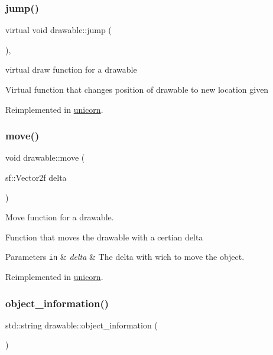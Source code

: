\subsubsection{\texorpdfstring{jump()}{jump()}}
{\footnotesize\ttfamily virtual void drawable\+::jump (\begin{DoxyParamCaption}{ }\end{DoxyParamCaption})\hspace{0.3cm}{\ttfamily [inline]}, {\ttfamily [virtual]}}



virtual draw function for a drawable 

Virtual function that changes position of drawable to new location given 

Reimplemented in \hyperlink{classunicorn_a07d5ca4e66632c0e871221a27146805a}{unicorn}.

\mbox{\label{classdrawable_ad0d3930c045cc6776aa2c3965be32491}} 
\subsubsection{\texorpdfstring{move()}{move()}}
{\footnotesize\ttfamily void drawable\+::move (\begin{DoxyParamCaption}\item[{sf\+::\+Vector2f}]{delta }\end{DoxyParamCaption})\hspace{0.3cm}{\ttfamily [virtual]}}



Move function for a drawable. 

Function that moves the drawable with a certian delta


\begin{DoxyParams}[1]{Parameters}
\mbox{\tt in}  & {\em delta} & The delta with wich to move the object. \\
\hline
\end{DoxyParams}


Reimplemented in \hyperlink{classunicorn_a162f200a68342f7bc0baaf17c8cf3f9f}{unicorn}.

\mbox{\label{classdrawable_a2ed0f8bb53f33477f7722efa7bb24583}} 
\subsubsection{\texorpdfstring{object\+\_\+information()}{object\_information()}}
{\footnotesize\ttfamily std\+::string drawable\+::object\+\_\+information (\begin{DoxyParamCaption}{ }\end{DoxyParamCaption})\hspace{0.3cm}{\ttfamily [virtual]}}



